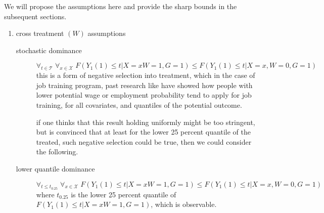\documentclass{article}
\begin{document}
We will propose the assumptions here and provide the sharp bounds in the subsequent sections.
\begin{enumerate}[(1)]
     \item cross treatment $(W)$ assumptions
        \begin{description}
            \item[stochastic dominance] \[\forall_{t\in\mathcal{T}}\;\forall_{x\in\mathcal{X}}\;F(Y_1(1) \leq t |X=x W=1, G=1 )\leq F(Y_1(1) \leq t |X=x ,W= 0, G=1)\]
            this is a form of negative selection into treatment, which in the case of job training program, past research like \cite{ashenfelter 1985, card, heckman 1999} have showed how people with lower potential wage or employment probability tend to apply for job training, for all covariates, and quantiles of the potential outcome.

            if one thinks that this result holding uniformly might be too stringent, but is convinced that at least for the lower 25 percent quantile of the treated, such negative selection could be true, then we could consider the following.
            \item[lower quantile dominance] \[\forall_{t \leq t_{0.25}}\;\forall_{x\in\mathcal{X}}\;F(Y_1(1) \leq t |X=x W=1, G=1 )\leq F(Y_1(1) \leq t |X=x ,W= 0, G=1)\]
            where $t_{0.25}$ is the lower 25 percent quantile of $ F(Y_1(1) \leq t |X=x W=1, G=1 )$, which is observable. 


\end{description}
\end{enumerate}
\end{document}
